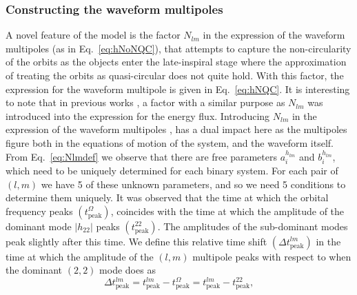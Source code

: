 \documentclass[aps,
prd,
amsmath,
amssymb,
twocolumn,
floatfix,
groupedaddress]{revtex4-1}
\newcommand{\ii}{{\rm i}}
\newcommand{\peak}{\mathrm{peak}}
\begin{document}
\subsubsection{Constructing the waveform multipoles}\label{sec:level3:hlm}
A novel feature of the model is the factor $N_{lm}$ in the expression of the waveform multipoles (as in Eq.~\eqref{eq:hNoNQC}), that attempts to capture the non-circularity of the orbits as the objects enter the late-inspiral stage where the approximation of treating the orbits as quasi-circular does not quite hold. With this factor, the expression for the waveform multipole is given in Eq.~\eqref{eq:hNQC}. It is interesting to note that in previous works \citep{EOBdevel02,EOBNRdevel04}, a factor with a similar purpose as $N_{lm}$ was introduced into the expression for the energy flux. Introducing $N_{lm}$ in the expression of the waveform multipoles \citep{DamourNQC01,BuonannoEOBv2Main}, has a dual impact here as the multipoles figure both in the equations of motion of the system, and the waveform itself.
From Eq.~\eqref{eq:Nlmdef} we observe that there are free parameters $a_i^{h_{lm}}$ and $b_i^{h_{lm}}$, which need to be uniquely determined for each binary system. For each pair of $(l,m)$ we have 5 of these unknown parameters, and so we need 5 conditions to determine them uniquely. It was observed \citep{BuonannoEOBv2Main} that the time at which the orbital frequency peaks $(t^{\Omega}_{\peak})$, coincides with the time at which the amplitude of the dominant mode $|h_{22}|$ peaks $(t^{22}_{\peak})$. The amplitudes of the sub-dominant modes peak slightly after this time. We define this relative time shift $(\Delta t^{lm}_{\peak})$ in the time at which the amplitude of the $(l,m)$ multipole peaks with respect to when the dominant $(2,2)$ mode does as
\begin{equation}
\Delta t^{lm}_{\peak} = t^{lm}_{\peak} - t^{\Omega}_{\peak} = t^{lm}_{\peak} - t^{22}_{\peak},
\end{equation}
\end{document}
